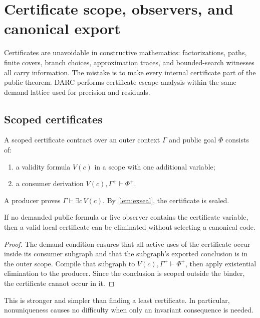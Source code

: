 \section{Certificate scope, observers, and canonical export}
\label{sec:certificates}

Certificates are unavoidable in constructive mathematics: factorizations,
paths, finite covers, branch choices, approximation traces, and bounded-search
witnesses all carry information.  The mistake is to make every internal
certificate part of the public theorem.  DARC performs certificate escape
analysis within the same demand lattice used for precision and residuals.

\subsection{Scoped certificates}

A scoped certificate contract over an outer context \(\Gamma\) and public goal
\(\Phi\) consists of:
\begin{enumerate}
  \item a validity formula \(V(c)\) in a scope with one additional variable;
  \item a consumer derivation
        \(V(c),\Gamma^+\vdash\Phi^+\).
\end{enumerate}
A producer proves \(\Gamma\vdash\exists c\,V(c)\).  By
\cref{lem:exseal}, the certificate is sealed.

\begin{theorem}
\label{thm:local-cert-erasure}
If no demanded public formula or live observer contains the certificate
variable, then a valid local certificate can be eliminated without selecting a
canonical code.
\end{theorem}

\begin{proof}
The demand condition ensures that all active uses of the certificate occur
inside its consumer subgraph and that the subgraph's exported conclusion is in
the outer scope.  Compile that subgraph to
\(V(c),\Gamma^+\vdash\Phi^+\), then apply existential elimination to the
producer.  Since the conclusion is scoped outside the binder, the certificate
cannot occur in it.
\end{proof}

This is stronger and simpler than finding a least certificate.  In particular,
nonuniqueness causes no difficulty when only an invariant consequence is
needed.

